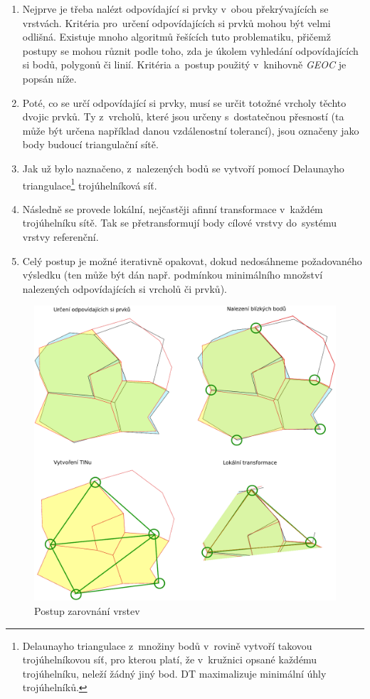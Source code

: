 \begin{enumerate}
 \item Nejprve je třeba nalézt odpovídající si prvky v~obou překrývajících se 
    vrstvách. Kritéria pro~určení odpovídajících si prvků mohou být velmi 
    odlišná. Existuje mnoho algoritmů řešících tuto problematiku, přičemž 
    postupy se mohou různit podle toho, zda je úkolem vyhledání 
    odpovídajících si bodů, polygonů či linií. Kritéria a~postup použitý 
    v~knihovně \textit{GEOC} je popsán níže.
 \item Poté, co se určí odpovídající si prvky, musí se určit totožné vrcholy 
    těchto dvojic prvků. Ty z~vrcholů, které jsou určeny s~dostatečnou 
    přesností (ta může být určena například danou vzdálenostní tolerancí), 
    jsou označeny jako body budoucí triangulační sítě.
 \item Jak už bylo naznačeno, z~nalezených bodů se vytvoří pomocí Delaunayho 
    triangulace\footnote{Delaunayho triangulace z~množiny bodů v~rovině vytvoří takovou 
    trojúhelníkovou síť, pro kterou platí, že v~kružnici opsané každému
    trojúhelníku, neleží žádný jiný bod. DT maximalizuje
    minimální úhly trojúhelníků.} trojúhelníková síť. 
 \item Následně se provede lokální, nejčastěji afinní transformace v~každém 
    trojúhelníku sítě. Tak se přetransformují body cílové vrstvy do~systému 
    vrstvy referenční.
 \item Celý postup je možné iterativně opakovat, dokud nedosáhneme 
    požadovaného výsledku (ten může být dán např. podmínkou minimálního 
    množství nalezených odpovídajících si vrcholů či prvků).
\end{enumerate}

\label{capic}
  \begin{figure}[hbt]
    \centering
      \includegraphics[width=350pt]{./pictures/ca-princip.pdf}
      \caption{Postup zarovnání vrstev}
      \label{fig:ca-princip}
  \end{figure}


